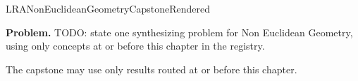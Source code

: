 \ifcsname LRANonEuclideanGeometryCapstoneRendered\endcsname
\else
\expandafter\gdef\csname LRANonEuclideanGeometryCapstoneRendered\endcsname{}

\newpage
{}
\label{cap:non-euclidean-geometry}

\begin{tcolorbox}[
  colback=gray!6,
  colframe=gray!40,
  arc=2pt,
  left=8pt, right=8pt, top=6pt, bottom=6pt,
  title={\small\textbf{Capstone Problem}},
  fonttitle=\small\bfseries
]
\textbf{Problem.}
TODO: state one synthesizing problem for Non Euclidean Geometry, using only concepts at or
before this chapter in the registry.
\end{tcolorbox}

\begin{remark*}
The capstone may use only results routed at or before this chapter.
\end{remark*}

\clearpage
\fi
